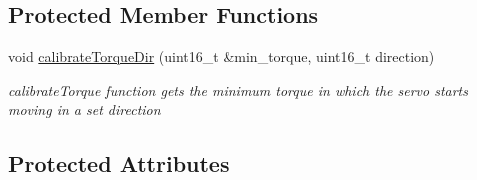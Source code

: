 \subsection*{Protected Member Functions}
\begin{DoxyCompactItemize}
\item 
void \hyperlink{classServoRHA_a2faeef2bb525c57171905d7390cfa1c9}{calibrate\+Torque\+Dir} (uint16\+\_\+t \&min\+\_\+torque, uint16\+\_\+t direction)
\begin{DoxyCompactList}\small\item\em calibrate\+Torque function gets the minimum torque in which the servo starts moving in a set direction \end{DoxyCompactList}\end{DoxyCompactItemize}
\subsection*{Protected Attributes}
